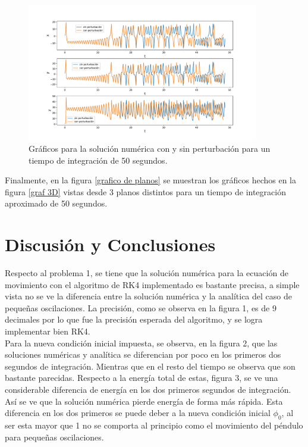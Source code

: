 \documentclass[letterpaper,oneside]{article}
\begin{document}
\begin{figure}
    \centering    
    \includegraphics[width=0.9\textwidth]{Tarea 2/grafico coordenadas vs tiempo.pdf}
    \caption{Gráficos para la solución numérica con y sin perturbación para un tiempo de integración de 50 segundos.}
    \label{graf coordenadas}
\end{figure}{}

\newpage
Finalmente, en la figura \ref{grafico de planos} se muestran los gráficos hechos en la figura \ref{graf 3D} vistas desde 3 planos distintos para un tiempo de integración aproximado de 50 segundos.



\newpage
\section{Discusión y Conclusiones}
Respecto al problema 1, se tiene que la solución numérica para la ecuación de movimiento con el algoritmo de RK4 implementado es bastante precisa, a simple vista no se ve la diferencia entre la solución numérica y la analítica del caso de pequeñas oscilaciones. La precisión, como se observa en la figura 1, es de 9 decimales por lo que fue la precisión esperada del algoritmo, y se logra implementar bien RK4. 
\\
Para la nueva condición inicial impuesta, se observa, en la figura 2, que las soluciones numéricas y analítica se diferencian por poco en los primeros dos segundos de integración. Mientras que en el resto del tiempo se observa que son bastante parecidas. Respecto a la energía total de estas, figura 3,  se ve una considerable diferencia de energía en los dos primeros segundos de integración. Así se ve que la solución numérica pierde energía de forma más rápida.  Esta diferencia en los dos primeros se puede deber a la nueva condición inicial $\phi_0$, al ser esta mayor que 1 no se comporta al principio como el movimiento del péndulo para pequeñas oscilaciones.  
\end{document}
